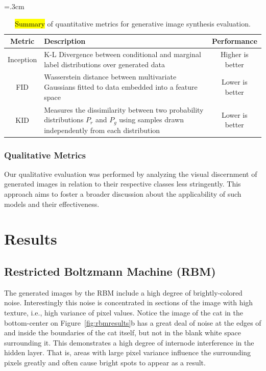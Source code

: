 \documentclass[technologies,article,accept,pdftex,moreauthors]{Definitions/mdpi}
\begin{document}
\begin{table}[H]
\caption{\hl{Summary} %
 of quantitative metrics for generative image synthesis evaluation.\label{tab:metrics}} 
\tabcolsep=.3cm 
    \begin{tabular}{cp{8cm}c} 
\toprule
  \textbf{Metric}& \textbf{Description} &\textbf{Performance}\\ 
 \midrule        
 {{Inception}} & K-L Divergence between conditional and marginal label distributions over generated data & Higher is better\\   \midrule   
 FID & Wasserstein distance between multivariate Gaussians fitted to data embedded into a feature space & Lower is better\\   \midrule   
 KID & Measures the dissimilarity between two probability distributions $P_r$ and $P_g$ using samples drawn independently from each distribution & Lower is better\\
 \bottomrule
    \end{tabular} 
\end{table}


\subsubsection{Qualitative Metrics}
Our qualitative evaluation was performed by analyzing the visual discernment of generated images in relation to their respective classes less stringently. This approach aims to foster a broader discussion about the applicability of such models and their effectiveness.

\section{Results}
\subsection{Restricted Boltzmann Machine (RBM)}

The generated images by the RBM include a high degree of brightly-colored noise. Interestingly this noise is concentrated in sections of the image with high texture, i.e., high variance of pixel values. Notice the image of the cat in the bottom-center on Figure~\ref{fig:rbmresults}b has a great deal of noise at the edges of and inside the boundaries of the cat itself, but not in the blank white space surrounding it. This demonstrates a high degree of internode interference in the hidden layer. That is, areas with large pixel variance influence the surrounding pixels greatly and often cause bright spots to appear as a result.
\end{document}
